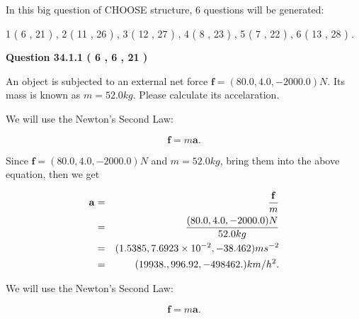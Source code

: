 \documentclass[12pt]{article}
\begin{document}
   
\vspace{0.2in}
   
 In this big question of CHOOSE structure,            6  questions will be generated: 
  
  
             1 (           6 ,          21 )
 ,
             2 (          11 ,          26 )
 ,
             3 (          12 ,          27 )
 ,
             4 (           8 ,          23 )
 ,
             5 (           7 ,          22 )
 ,
             6 (          13 ,          28 )
 .
  
\vspace{0.2in}
  
{\textbf{\Large{Question
34.1.1 
 (           6 ,           6 ,          21 )
}}}
  
  
 
An object is subjected to an external net force $\mathbf{f}=(
80.0,  %
4.0,
-2000.0  )N$. Its mass is known as
$m= %
52.0 kg$. Please calculate its accelaration.
 
 
 
 
\noindent{}
 
 

We will use the Newton's Second Law:
 
\[
\mathbf{f}=m\mathbf{a}.
\]
 
Since $\mathbf{f}=( %
80.0,  %
4.0,  %
-2000.0 )N$
and $m= %
52.0 kg$, bring them into the above equation, then we get
 
\begin{eqnarray*}
\mathbf{a}&=&\frac{\mathbf{f}}m  \\
&=&\frac{(
80.0 ,
4.0 ,
-2000.0 )N
}{ %
52.0 kg}  \\
&=&(
1.5385 ,
7.6923 \times 10^{-2},
-38.462
)ms^{-2} \\
&=&(
19938. ,
996.92 ,
-498462.
)km/h^2.
\end{eqnarray*}
 
 
 
\noindent{}
 
 

 
 
 
\noindent{}
 
 

We will use the Newton's Second Law:
 
\[
\mathbf{f}=m\mathbf{a}.
\]
 
\end{document}
